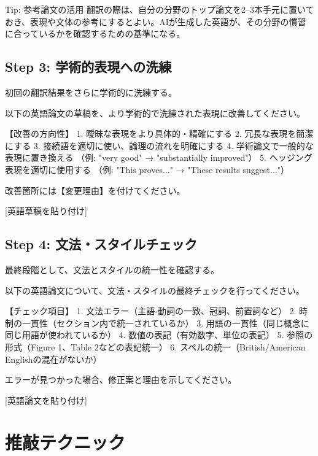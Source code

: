 \begin{itembox}[l]{Tip: 参考論文の活用}
翻訳の際は、自分の分野のトップ論文を2--3本手元に置いておき、表現や文体の参考にするとよい。AIが生成した英語が、その分野の慣習に合っているかを確認するための基準になる。
\end{itembox}

\subsection*{Step 3: 学術的表現への洗練}

初回の翻訳結果をさらに学術的に洗練する。

\begin{promptbox}
以下の英語論文の草稿を、より学術的で洗練された表現に改善してください。

【改善の方向性】
1. 曖昧な表現をより具体的・精確にする
2. 冗長な表現を簡潔にする
3. 接続語を適切に使い、論理の流れを明確にする
4. 学術論文で一般的な表現に置き換える
   （例: "very good" → "substantially improved"）
5. ヘッジング表現を適切に使用する
   （例: "This proves..." → "These results suggest..."）

改善箇所には【変更理由】を付けてください。

{[}英語草稿を貼り付け]
\end{promptbox}

\subsection*{Step 4: 文法・スタイルチェック}

最終段階として、文法とスタイルの統一性を確認する。

\begin{promptbox}
以下の英語論文について、文法・スタイルの最終チェックを行ってください。

【チェック項目】
1. 文法エラー（主語-動詞の一致、冠詞、前置詞など）
2. 時制の一貫性（セクション内で統一されているか）
3. 用語の一貫性（同じ概念に同じ用語が使われているか）
4. 数値の表記（有効数字、単位の表記）
5. 参照の形式（Figure 1、Table 2などの表記統一）
6. スペルの統一（British/American Englishの混在がないか）

エラーが見つかった場合、修正案と理由を示してください。

{[}英語論文を貼り付け]
\end{promptbox}

\section{推敲テクニック}
\label{sec:4.4}

